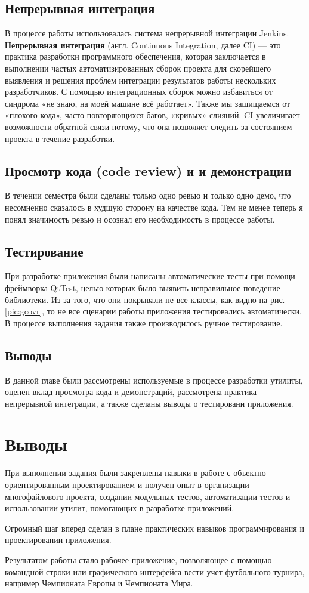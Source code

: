 \subsection{Непрерывная интеграция}
В процессе работы использовалась система непрерывной интеграции Jenkins. \textbf{Непрерывная интеграция} (англ. Continuous Integration, далее CI) — это практика разработки программного обеспечения, которая заключается в выполнении частых автоматизированных сборок проекта для скорейшего выявления и решения проблем интеграции результатов работы нескольких разработчиков. С помощью интеграционных сборок можно избавиться от синдрома «не знаю, на моей машине всё работает». Также мы защищаемся от «плохого кода», часто повторяющихся багов, «кривых» слияний. CI увеличивает возможности обратной связи потому, что она позволяет следить за состоянием проекта в течение разработки.

\subsection{Просмотр кода (code review) и и демонстрации}
В течении семестра были сделаны только одно ревью и только одно демо, что несомненно сказалось в худшую сторону на качестве кода. Тем не менее теперь я понял значимость ревью и осознал его необходимость в процессе работы.

\subsection{Тестирование}
При разработке приложения были написаны автоматические тесты при помощи фреймворка QtTest, целью которых было выявить неправильное поведение библиотеки. Из-за того, что они покрывали не все классы, как видно на рис. \ref{pic:gcovr}, то не все сценарии работы приложения тестировались автоматически. В процессе выполнения задания также производилось ручное тестирование.

\subsection{Выводы}
В данной главе были рассмотрены используемые в процессе разработки утилиты, оценен вклад просмотра кода и демонстраций, рассмотрена практика непрерывной интеграции, а также сделаны выводы о тестировани приложения.

\section{Выводы}
При выполнении задания были закреплены навыки в работе с объектно-ориентированным проектированием и получен опыт в организации многофайлового проекта, создании модульных тестов, автоматизации тестов и использовании утилит, помогающих в разработке приложений.

Огромный шаг вперед сделан в плане практических навыков программирования и проектировании приложения.

Результатом работы стало рабочее приложение, позволяющее с помощью командной строки или графического интерфейса вести учет футбольного турнира, например Чемпионата Европы и Чемпионата Мира.


